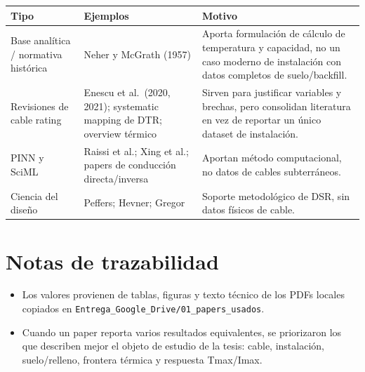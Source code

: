 \documentclass[11pt,a4paper,oneside]{report}
\begin{document}
\begin{longtable}[]{@{}
  >{\raggedright\arraybackslash}p{}
  >{\raggedright\arraybackslash}p{}
  >{\raggedright\arraybackslash}p{}@{}}
\toprule\noalign{}
\begin{minipage}[b]{\linewidth}\raggedright
Tipo
\end{minipage} & \begin{minipage}[b]{\linewidth}\raggedright
Ejemplos
\end{minipage} & \begin{minipage}[b]{\linewidth}\raggedright
Motivo
\end{minipage} \\
\midrule\noalign{}
\endhead
\bottomrule\noalign{}
\endlastfoot
Base analítica / normativa histórica & Neher y McGrath (1957) & Aporta
formulación de cálculo de temperatura y capacidad, no un caso moderno de
instalación con datos completos de suelo/backfill. \\
Revisiones de cable rating & Enescu et al.~(2020, 2021); systematic
mapping de DTR; overview térmico & Sirven para justificar variables y
brechas, pero consolidan literatura en vez de reportar un único dataset
de instalación. \\
PINN y SciML & Raissi et al.; Xing et al.; papers de conducción
directa/inversa & Aportan método computacional, no datos de cables
subterráneos. \\
Ciencia del diseño & Peffers; Hevner; Gregor & Soporte metodológico de
DSR, sin datos físicos de cable. \\
\end{longtable}

\section{Notas de trazabilidad}\label{notas-de-trazabilidad}

\begin{itemize}
\item
  Los valores provienen de tablas, figuras y texto técnico de los PDFs
  locales copiados en
  \texttt{Entrega\_Google\_Drive/01\_papers\_usados}.
\item
  Cuando un paper reporta varios resultados equivalentes, se priorizaron
  los que describen mejor el objeto de estudio de la tesis: cable,
  instalación, suelo/relleno, frontera térmica y respuesta Tmax/Imax.

\end{itemize}
\end{document}
